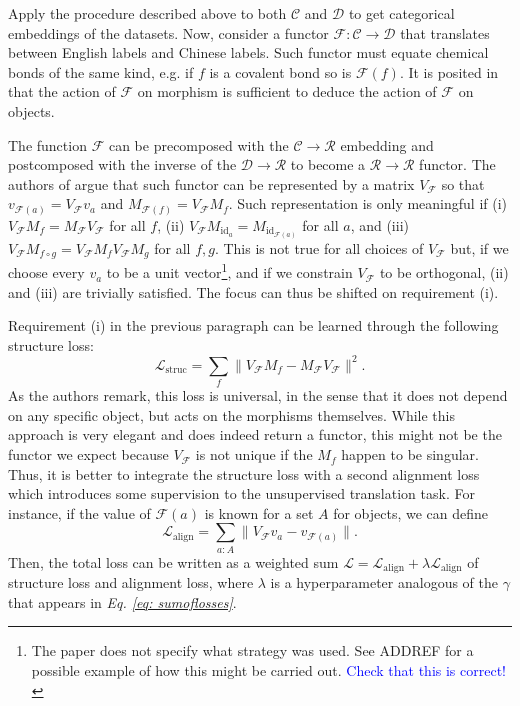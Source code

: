 \documentclass[12pt,a4paper,openright,twoside]{report}
\theoremstyle{plain}
\theoremstyle{definition}
\begin{document}
Apply the procedure described above to both $\mathcal{C}$ and $\mathcal{D}$ to get categorical embeddings of the datasets. Now, consider a functor $\mathcal{F}: \mathcal{C} \to \mathcal{D}$ that translates between English labels and Chinese labels. Such functor must equate chemical bonds of the same kind, e.g. if $f$ is a covalent bond so is $\mathcal{F}(f)$. It is posited in \cite{sheshmani2021categorical} that the action of $\mathcal{F}$ on morphism is sufficient to deduce the action of $\mathcal{F}$ on objects.


The function $\mathcal{F}$ can be precomposed with the $\mathcal{C} \to \mathcal{R}$ embedding and postcomposed with the inverse of the $\mathcal{D} \to \mathcal{R}$ to become a $\mathcal{R} \to \mathcal{R}$ functor. The authors of \cite{sheshmani2021categorical} argue that such functor can be represented by a matrix $V_\mathcal{F}$ so that $v_{\mathcal{F}(a)} =  V_\mathcal{F}v_a$ and $M_{\mathcal{F}(f)} = V_\mathcal{F}M_f$. Such representation is only meaningful if (i) $V_{\mathcal{F}}M_f = M_{\mathcal{F}}V_{\mathcal{F}}$ for all $f$, (ii) $V_{\mathcal{F}}M_{\mathrm{id}_a} = M_{\mathrm{id}_{\mathcal{F}(a)}}$ for all $a$, and (iii) $V_{\mathcal{F}}M_{f \circ g} = V_{\mathcal{F}}M_fV_{\mathcal{F}}M_g$ for all $f,g$. This is not true for all choices of  $V_\mathcal{F}$ but, if we choose every $v_a$ to be a unit vector\footnote{The paper does not specify what strategy was used. See ADDREF for a possible example of how this might be carried out. \textcolor{blue}{Check that this is correct!}}, and if we constrain $V_{\mathcal{F}}$ to be orthogonal, (ii) and (iii) are trivially satisfied. The focus can thus be shifted on requirement (i).


Requirement (i) in the previous paragraph can be learned through the following structure loss:
\[\mathcal{L}_{\mathrm{struc}} = \sum_{f}\|V_{\mathcal{F}}M_f - M_{\mathcal{F}}V_{\mathcal{F}}\|^2.\]
As the authors remark, this loss is universal, in the sense that it does not depend on any specific object, but acts on the morphisms themselves. While this approach is very elegant and does indeed return a functor, this might not be the functor we expect because $V_{\mathcal{F}}$ is not unique if the $M_f$ happen to be singular. Thus, it is better to integrate the structure loss with a second alignment loss which introduces some supervision to the unsupervised translation task. For instance, if the value of $\mathcal{F}(a)$ is known for a set $A$ for objects, we can define
\[\mathcal{L}_{\mathrm{align}} = \sum_{a : A}\|V_{\mathcal{F}}v_a - v_{\mathcal{F}(a)}\|.\]
Then, the total loss can be written as a weighted sum $\mathcal{L} = \mathcal{L}_{\mathrm{align}} + \lambda \mathcal{L}_{\mathrm{align}}$ of structure loss and alignment loss, where $\lambda$ is a hyperparameter analogous of the $\gamma$ that appears in \textit{Eq. \ref{eq: sumoflosses}}.
\end{document}
